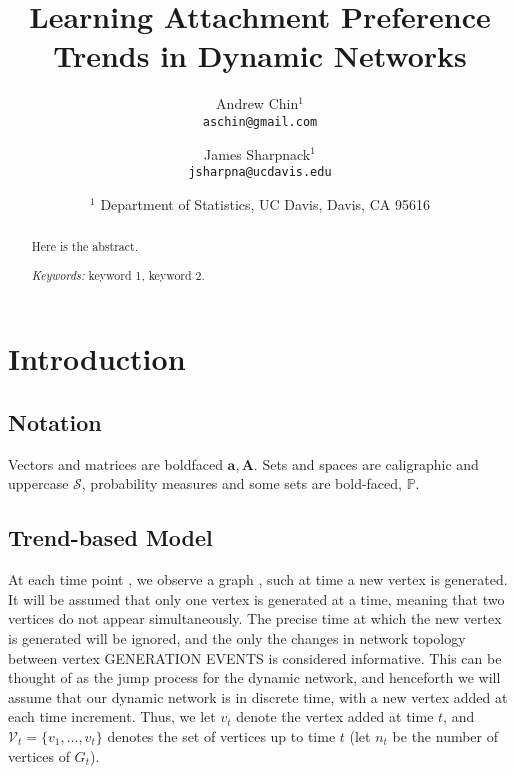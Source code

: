 \documentclass[twoside,11pt]{article}
\newcommand{\pp}{\mathbb} %
\newcommand{\cc}{\mathcal} %
\newcommand{\teq}[1]{\smash{$#1$}}
\begin{document}
\title{Learning Attachment Preference Trends in Dynamic Networks}
\author{
Andrew Chin$^{1}$\\
{\tt aschin@gmail.com}\\
\and
James Sharpnack$^{1}$ \\
{\tt  jsharpna@ucdavis.edu} \\
\and
\begin{tabular}{c}
  $^{1}$ Department of Statistics, UC Davis, Davis, CA 95616\\
\end{tabular}
}

\date{}%
\maketitle

\begin{abstract}
Here is the abstract.

\medskip\noindent
{\em Keywords:} keyword 1, keyword 2.
\end{abstract}


\section{Introduction}
\label{sec:intro}

\subsection{Notation}
Vectors and matrices are boldfaced $\bm a, \bm A$.
Sets and spaces are caligraphic and uppercase $\cc S$, probability measures and some sets are bold-faced, $\pp P$.

\subsection{Trend-based Model}

At each time point \teq t, we observe a graph \teq{G_t}, such at time \teq t a new vertex is generated.
It will be assumed that only one vertex is generated at a time, meaning that two vertices do not appear simultaneously.
The precise time at which the new vertex is generated will be ignored, and the only the changes in network topology  between vertex GENERATION EVENTS is considered informative.
This can be thought of as the jump process for the dynamic network, and henceforth we will assume that our dynamic network is in discrete time, with a new vertex added at each time increment.
Thus, we let $v_t$ denote the vertex added at time $t$, and $\cc V_{t} = \{v_1,\ldots,v_t \}$ denotes the set of vertices up to time $t$ (let $n_t$ be the number of vertices of $G_t$).
\end{document}
